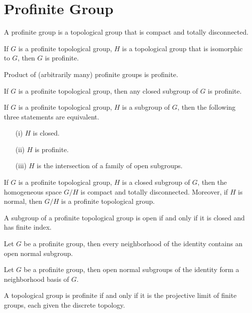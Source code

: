\chapter{Profinite Group}

\begin{definition}
	\leanok
	A profinite group is a topological group that is compact and totally disconnected.
\end{definition}

\begin{lemma}
	\leanok
	If $G$ is a profinite topological group, $H$ is a topological group that is isomorphic to $G$, then $G$ is profinite.
\end{lemma}

\begin{lemma}
	Product of (arbitrarily many) profinite groups is profinite.
\end{lemma}

\begin{lemma}
	\leanok
	If $G$ is a profinite topological group, then any closed subgroup of $G$ is profinite.
\end{lemma}

\begin{theorem}
	If $G$ is a profinite topological group, $H$ is a subgroup of $G$, then the following three statements
	are equivalent.
	\begin{itemize}
		\item[(i)] $ H $ is closed.
		\item[(ii)] $ H $ is profinite.
		\item[(iii)] $ H $ is the intersection of a family of open subgroups.
	\end{itemize}
\end{theorem}

\begin{lemma}
	If $G$ is a profinite topological group, $H$ is a closed subgroup of $G$, then the homogeneous space $G / H$ is compact and totally disconnected. Moreover, if $H$ is normal, then $G / H$ is a profinite topological group.
\end{lemma}

\begin{lemma}
	A subgroup of a profinite topological group is open if and only if it is closed and has finite index.
\end{lemma}

\begin{lemma}
	Let $ G $ be a profinite group, then every neighborhood of the identity contains an open normal subgroup.
\end{lemma}

\begin{lemma}
	Let $ G $ be a profinite group, then open normal subgroups of the identity form a neighborhood basis of $ G $.
\end{lemma}

\begin{theorem}
	A topological group is profinite if and only if it is the projective limit of finite groups, each given the discrete topology.
\end{theorem}

